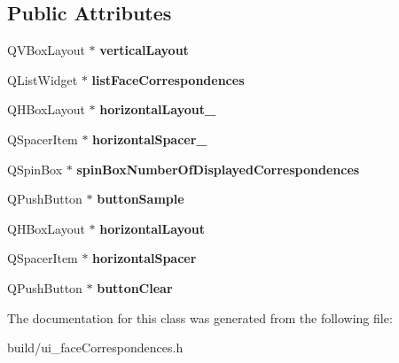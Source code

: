 \subsection*{Public Attributes}
\begin{DoxyCompactItemize}
\item 
\hypertarget{class_ui___face_correspondences_widget_a14be492cbecfac91c3bc69df19ff0e3c}{}Q\+V\+Box\+Layout $\ast$ {\bfseries vertical\+Layout}\label{class_ui___face_correspondences_widget_a14be492cbecfac91c3bc69df19ff0e3c}

\item 
\hypertarget{class_ui___face_correspondences_widget_ab81420d10a8415e87baae70ae862bb8f}{}Q\+List\+Widget $\ast$ {\bfseries list\+Face\+Correspondences}\label{class_ui___face_correspondences_widget_ab81420d10a8415e87baae70ae862bb8f}

\item 
\hypertarget{class_ui___face_correspondences_widget_a5d36eae561682ed2d5852250a1208f73}{}Q\+H\+Box\+Layout $\ast$ {\bfseries horizontal\+Layout\+\_}\label{class_ui___face_correspondences_widget_a5d36eae561682ed2d5852250a1208f73}

\item 
\hypertarget{class_ui___face_correspondences_widget_a02ed52079ff657a6dc08f8a97e9ebdc1}{}Q\+Spacer\+Item $\ast$ {\bfseries horizontal\+Spacer\+\_}\label{class_ui___face_correspondences_widget_a02ed52079ff657a6dc08f8a97e9ebdc1}

\item 
\hypertarget{class_ui___face_correspondences_widget_a45556d3da9c4590c75b19215b479ca4d}{}Q\+Spin\+Box $\ast$ {\bfseries spin\+Box\+Number\+Of\+Displayed\+Correspondences}\label{class_ui___face_correspondences_widget_a45556d3da9c4590c75b19215b479ca4d}

\item 
\hypertarget{class_ui___face_correspondences_widget_a0c3a67ae109ee7958dd54499196c6812}{}Q\+Push\+Button $\ast$ {\bfseries button\+Sample}\label{class_ui___face_correspondences_widget_a0c3a67ae109ee7958dd54499196c6812}

\item 
\hypertarget{class_ui___face_correspondences_widget_a101a07686f2b915ce1050ce59f5b94d0}{}Q\+H\+Box\+Layout $\ast$ {\bfseries horizontal\+Layout}\label{class_ui___face_correspondences_widget_a101a07686f2b915ce1050ce59f5b94d0}

\item 
\hypertarget{class_ui___face_correspondences_widget_adbf1e411b0a758d3139d4aa0fe1cb492}{}Q\+Spacer\+Item $\ast$ {\bfseries horizontal\+Spacer}\label{class_ui___face_correspondences_widget_adbf1e411b0a758d3139d4aa0fe1cb492}

\item 
\hypertarget{class_ui___face_correspondences_widget_a7462e4cd19f0ef2671a018e70ecb2c8b}{}Q\+Push\+Button $\ast$ {\bfseries button\+Clear}\label{class_ui___face_correspondences_widget_a7462e4cd19f0ef2671a018e70ecb2c8b}

\end{DoxyCompactItemize}


The documentation for this class was generated from the following file\+:\begin{DoxyCompactItemize}
\item 
build/ui\+\_\+face\+Correspondences.\+h\end{DoxyCompactItemize}
